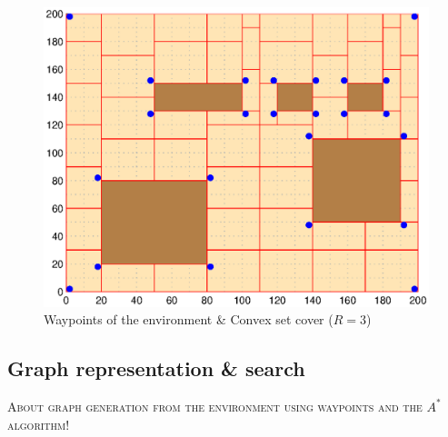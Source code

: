 \begin{figure}[h!t]
	\includegraphics[width=\linewidth]{fig/convexCover.eps}
	\caption{Waypoints of the environment \& Convex set cover ($R=3$)}
	\label{convexCover}
\end{figure}


\subsection{Graph representation \& search}

\textsc{About graph generation from the environment using waypoints and the $A^{\ast}$ algorithm!}
